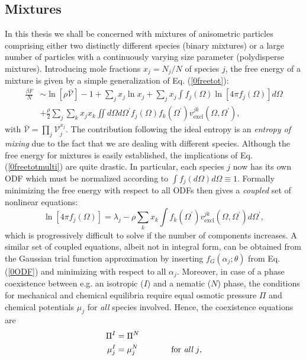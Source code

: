 \documentclass[amssymb]{revtex4}
\begin{document}
\subsection{Mixtures}
In this thesis we shall be concerned with mixtures of anisometric particles
comprising either two distinctly different species (binary mixtures) or
a large number of particles with a continuously varying  size parameter 
(polydisperse mixtures). Introducing  mole fractions $x_{j}=N_{j}/N$ of
species $j$,  the free energy of a mixture is given by a simple generalization of Eq. (\ref{0freetot}):
\begin{align}
\frac{\beta F}{N} &\sim \ln [\rho \mathcal{\bar{V}}]-1 + \sum_{j} x_{j} \ln x_{j} + 
\sum_{j} x_{j} \int f_{j}(\Omega)\ln \left[ 4 \pi f_{j}(\Omega) \right] d \Omega \nonumber \\
&+\frac{\rho}{2}\sum_{j}\sum_{k}x_{j}x_{k} \iint  d \Omega d\Omega^{\prime} 
f_{j}(\Omega)f_{k}(\Omega^{\prime}) 
v_{\text{excl}}^{jk}(\Omega,\Omega^{\prime}),  \label{0freetotmulti}
\end{align}
with $\mathcal{\bar{V}}=\prod_{j}\mathcal{V}_{j}^{x_{j}}$. The contribution following the ideal entropy is an {\em entropy of mixing} due to the fact that we are dealing with different species.
Although the free energy for mixtures is easily established,  the implications of Eq. (\ref{0freetotmulti})
are quite drastic. In particular, each species $j$ now has its own ODF 
which must be normalized according to $\int f_{j}(d\Omega)d\Omega \equiv 1$. Formally minimizing the free energy
with respect to all ODFs then gives a {\em coupled} set of nonlinear equations:
\begin{equation}
\ln[4\pi f_{j}(\Omega)]=\lambda_{j} - \rho \sum_{k} x_{k} \int f_{k}(\Omega^{\prime})v_{\text{excl}}^{jk}(\Omega,\Omega^{\prime})
d\Omega^{\prime}, \label{0inteqmulti}
\end{equation}
which  is  progressively difficult to solve if the number of components increases.
A similar set of coupled equations, albeit not in integral form, 
can be obtained from the Gaussian trial function approximation by inserting
$f_{G}(\alpha_{j};\theta)$ from Eq. (\ref{0ODF}) and minimizing with respect to all $\alpha_{j}$.
Moreover, in case of a phase coexistence between e.g. an isotropic ($I$) and a nematic ($N$) phase, the conditions for 
mechanical and chemical equilibria require equal osmotic pressure $\Pi$ and chemical potentials $\mu_{j}$ for {\em all} species involved. 
Hence, the coexistence equations are
\begin{align}
\Pi^{I}&=\Pi^{N} \nonumber \\
\mu^{I}_{j}&=\mu^{N}_{j} \qquad\qquad \text{for {\em all} $j$},
\end{align}
\end{document}
